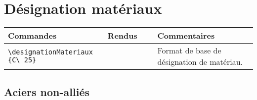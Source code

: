 \documentclass[a4paper,12pt]{article}
\begin{document}
\section{Désignation matériaux}

		\noindent
		\begin{tabular}{|p{0.4\linewidth}|p{0.2\linewidth}|p{0.4\linewidth}|}
			\hline
				\textbf{Commandes}&\textbf{Rendus}&\textbf{Commentaires}
			\\\hline\hline
				\verb!\designationMateriaux! \verb!{C\ 25}!	&	\designationMateriaux{C\ 25}	&	Format de base de désignation de matériau.
			\\\hline
		\end{tabular}


	\subsection{Aciers non-alliés}
\end{document}
